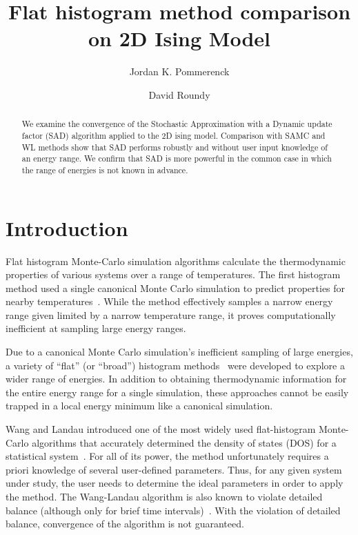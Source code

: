 \documentclass[letterpaper,twocolumn,amsmath,amssymb,pre,aps,10pt]{revtex4-1}
\begin{document}
\title{Flat histogram method comparison on 2D Ising Model
}

\author{Jordan K. Pommerenck} \author{David Roundy}

\begin{abstract}
  We examine the convergence of the Stochastic Approximation with a Dynamic
  update factor (SAD) algorithm applied to the 2D ising model. Comparison with
  SAMC and WL methods show that SAD performs robustly and without user input
  knowledge of an energy range. We confirm that SAD is more powerful in the
  common case in which the range of energies is not known in advance.
\end{abstract}

\maketitle

\section{Introduction}
Flat histogram Monte-Carlo simulation algorithms calculate the thermodynamic
properties of various systems over a range of temperatures.  The first histogram
method used a single canonical Monte Carlo simulation to predict properties for
nearby temperatures~\cite{ferrenberg1988new}. While the method effectively
samples a narrow energy range given limited by a narrow temperature range, it
proves computationally inefficient at sampling large energy ranges.

Due to a canonical Monte Carlo simulation's inefficient sampling of large
energies, a variety of ``flat'' (or ``broad'') histogram
methods~\cite{penna1996broad, penna1998broad, swendsen1999transition,
wang2001determining, wang2001efficient} were developed to explore a wider range
of energies.  In addition to obtaining thermodynamic information for the entire
energy range for a single simulation, these approaches cannot be easily trapped
in a local energy minimum like a canonical simulation.


Wang and Landau introduced one of the most widely used flat-histogram
Monte-Carlo algorithms that accurately determined the density of states (DOS) for
a statistical system~\cite{wang2001determining,wang2001efficient}. For all of
its power, the method unfortunately requires a priori knowledge of several
user-defined parameters. Thus, for any given system under study, the user needs
to determine the ideal parameters in order to apply the method. The Wang-Landau
algorithm is also known to violate detailed balance (although only for brief
time intervals)~\cite{yan2003fast, shell2002generalization}. With the violation
of detailed balance, convergence of the algorithm is not guaranteed.
\end{document}
